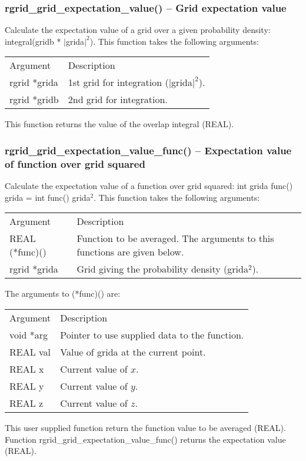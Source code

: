 \documentclass[12pt,letterpaper]{article}
\begin{document}
\subsubsection{rgrid\_grid\_expectation\_value() -- Grid expectation value}

Calculate the expectation value of a grid over a given probability density: integral(gridb * $|$grida$|^2$). This function takes the following arguments:
\begin{longtable}{p{} p{}}
Argument & Description\\
\cline{1-2}
rgrid *grida & 1st grid for integration ($|$grida$|^2$).\\
rgrid *gridb & 2nd grid for integration.\\
\end{longtable}
\noindent
This function returns the value of the overlap integral (REAL).

\subsubsection{rgrid\_grid\_expectation\_value\_func() -- Expectation value of function over grid squared}

Calculate the expectation value of a function over grid squared: int grida func() grida = int func() grida$^2$. This function takes the following arguments:
\begin{longtable}{p{} p{}}
Argument & Description\\
\cline{1-2}
REAL (*func)() & Function to be averaged. The arguments to this functions are given below.\\
rgrid *grida & Grid giving the probability density (grida$^2$).\\
\end{longtable}
\noindent
The arguments to (*func)() are:
\begin{longtable}{p{} p{}}
Argument & Description\\
\cline{1-2}
void *arg & Pointer to use supplied data to the function.\\
REAL val & Value of grida at the current point.\\
REAL x & Current value of $x$.\\
REAL y & Current value of $y$.\\
REAL z & Current value of $z$.\\
\end{longtable}
\noindent
This user supplied function return the function value to be averaged (REAL). Function rgrid\_grid\_expectation\_value\_func() returns the expectation value (REAL).
\end{document}
